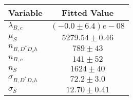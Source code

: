 \begin{tabular}[t]{lc}
\hline
Variable &Fitted Value\\
\hline\hline
$\lambda_{B,c}$&$(-0.0\pm6.4)e-08$\\
\hline
$\mu_S$&$5279.54\pm0.46$\\
\hline
$n_{B, D^* D_s h}$&$789\pm43$\\
\hline
$n_{B,c}$&$141\pm52$\\
\hline
$n_S$&$1624\pm40$\\
\hline
$\sigma_{B, D^* D_s h}$&$72.2\pm3.0$\\
\hline
$\sigma_S$&$12.70\pm0.41$\\
\hline
\end{tabular}